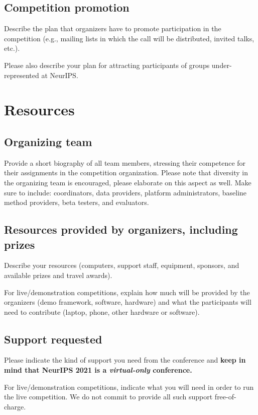 \documentclass[11pt, oneside]{article}
\begin{document}
\subsection{Competition promotion}

Describe the plan that organizers have to promote participation in the competition (e.g., mailing lists in which the call will be distributed, invited talks, etc.).


Please also describe your plan  for attracting participants of groups under-represented at NeurIPS.





\section{Resources}

\subsection{Organizing team}

Provide a short biography of all team members, stressing their competence for their assignments in the competition organization. Please note that diversity in the organizing team is encouraged, please elaborate on this aspect as well.  Make sure to include: coordinators, data providers, platform administrators, baseline method providers, beta testers, and evaluators.
\subsection{Resources provided by organizers, including prizes}

Describe your resources (computers, support staff, equipment, sponsors, and available prizes and travel awards).

For live/demonstration competitions, explain how much will be provided by the organizers (demo framework, software, hardware) and what the participants will need to contribute (laptop, phone, other hardware or software).

\subsection{Support requested}
Please indicate the kind of support you need from the conference and \textbf{keep in mind that NeurIPS 2021 is a \emph{virtual-only} conference.}

For live/demonstration competitions, indicate what you will need in order to run the live competition. We do not commit to provide all such support free-of-charge.
\end{document}
